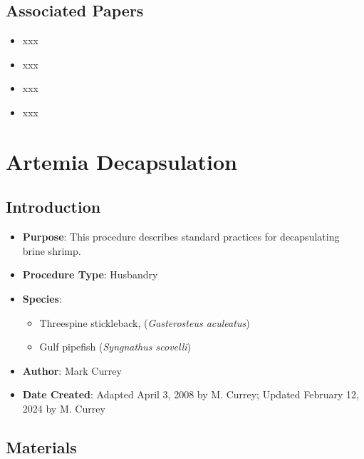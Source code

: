 \documentclass[
  letterpaper,
  DIV=11,
  numbers=noendperiod]{scrreprt}
\providecommand{\tightlist}{%
  \setlength{\itemsep}{0pt}\setlength{\parskip}{0pt}}\usepackage{longtable,booktabs,array}
\begin{document}
\hypertarget{associated-papers-1}{%
\section{Associated Papers}\label{associated-papers-1}}

\begin{itemize}
\tightlist
\item
  xxx
\item
  xxx
\item
  xxx
\item
  xxx
\end{itemize}

\hypertarget{sec-husbandry-brineshrimp_decap}{%
\chapter{Artemia Decapsulation}\label{sec-husbandry-brineshrimp_decap}}

\hypertarget{introduction-8}{%
\section{Introduction}\label{introduction-8}}

\begin{itemize}
\tightlist
\item
  \textbf{Purpose}: This procedure describes standard practices for
  decapsulating brine shrimp.
\item
  \textbf{Procedure Type}: Husbandry
\item
  \textbf{Species}:

  \begin{itemize}
  \tightlist
  \item
    Threespine stickleback, (\emph{Gasterosteus aculeatus})
  \item
    Gulf pipefish (\emph{Syngnathus scovelli})
  \end{itemize}
\item
  \textbf{Author}: Mark Currey
\item
  \textbf{Date Created}: Adapted April 3, 2008 by M. Currey; Updated
  February 12, 2024 by M. Currey
\end{itemize}

\hypertarget{materials-8}{%
\section{Materials}\label{materials-8}}
\end{document}
